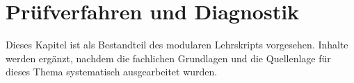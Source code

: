 \chapter{Prüfverfahren und Diagnostik}
\label{chap:13-pruefverfahren}

Dieses Kapitel ist als Bestandteil des modularen Lehrskripts vorgesehen.
Inhalte werden ergänzt, nachdem die fachlichen Grundlagen und die
Quellenlage für dieses Thema systematisch ausgearbeitet wurden.
